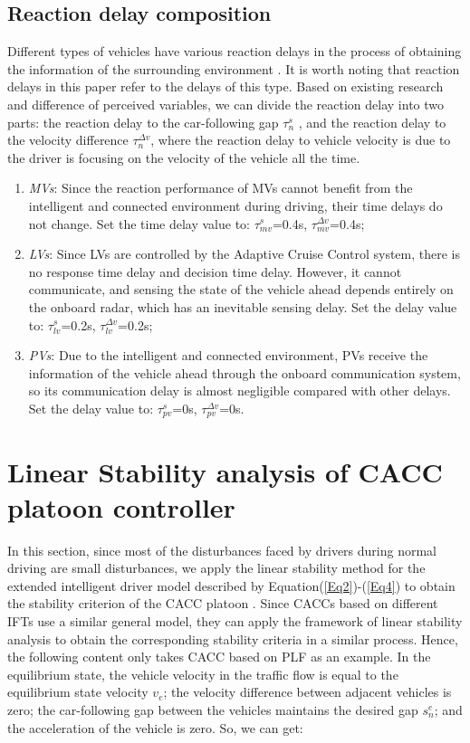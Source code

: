 \documentclass[journal]{IEEEtran}
\begin{document}
\subsection{Reaction delay composition}

Different types of vehicles have various reaction delays in the process of obtaining the information of the surrounding environment \citep{ngoduy2013analytical,yao2021linear}. It is worth noting that reaction delays in this paper refer to the delays of this type. Based on existing research and difference of perceived variables, we can divide the reaction delay into two parts: the reaction delay to the car-following gap $\tau_n^s$ , and the reaction delay to the velocity difference $\tau_n^{\Delta v}$, where the reaction delay to vehicle velocity is due to the driver is focusing on the velocity of the vehicle all the time.

\begin{enumerate}
	\item \emph{MVs}: Since the reaction performance of MVs cannot benefit from the intelligent and connected environment during driving, their time delays do not change. Set the time delay value to: 
	$\tau_{mv}^{s}$=0.4s, $\tau_{mv}^{\Delta v}$=0.4s;
	\item \emph{LVs}: Since LVs are controlled by the Adaptive Cruise Control system, there is no response time delay and decision time delay. However, it cannot communicate, and sensing the state of the vehicle ahead depends entirely on the onboard radar, which has an inevitable sensing delay. Set the delay value to: $\tau_{lv}^{s}$=0.2s, $\tau_{lv}^{\Delta v}$=0.2s;
	\item \emph{PVs}: Due to the intelligent and connected environment, PVs receive the information of the vehicle ahead through the onboard communication system, so its communication delay is almost negligible compared with other delays. Set the delay value to: $\tau_{pv}^{s}$=0s, $\tau_{pv}^{\Delta v}$=0s.
\end{enumerate}


\section{Linear Stability analysis of CACC platoon controller}
\label{Section 4}
In this section, since most of the disturbances faced by drivers during normal driving are small disturbances, we apply the linear stability method for the extended intelligent driver model described by Equation(\ref{Eq2})-(\ref{Eq4}) to obtain the stability criterion of the CACC platoon \citep{jin2014dynamics,sun2018stability}. Since CACCs based on different IFTs use a similar general model, they can apply the framework of linear stability analysis to obtain the corresponding stability criteria in a similar process. Hence, the following content only takes CACC based on PLF as an example.
In the equilibrium state, the vehicle velocity in the traffic flow is equal to the equilibrium state velocity $v_e$; the velocity difference between adjacent vehicles is zero; the car-following gap between the vehicles maintains the desired gap $s_n^e$; and the acceleration of the vehicle is zero. So, we can get:
\end{document}
